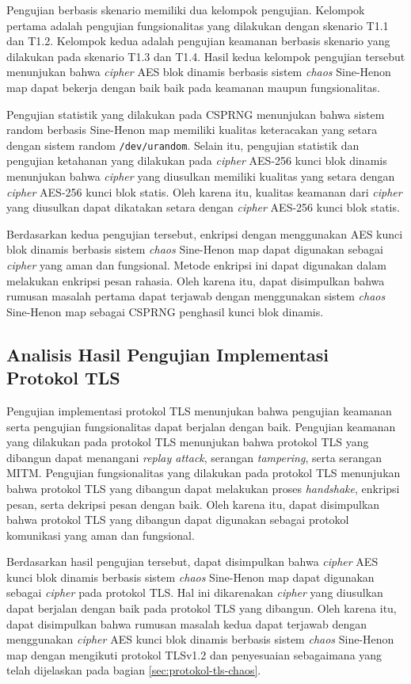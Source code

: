 Pengujian berbasis skenario memiliki dua kelompok pengujian. Kelompok pertama adalah pengujian fungsionalitas yang dilakukan dengan skenario T1.1 dan T1.2. Kelompok kedua adalah pengujian keamanan berbasis skenario yang dilakukan pada skenario T1.3 dan T1.4. Hasil kedua kelompok pengujian tersebut menunjukan bahwa \emph{cipher} AES blok dinamis berbasis sistem \emph{chaos} Sine-Henon map dapat bekerja dengan baik baik pada keamanan maupun fungsionalitas.

Pengujian statistik yang dilakukan pada CSPRNG menunjukan bahwa sistem random berbasis Sine-Henon map memiliki kualitas keteracakan yang setara dengan sistem random \texttt{/dev/urandom}. Selain itu, pengujian statistik dan pengujian ketahanan yang dilakukan pada \emph{cipher} AES-256 kunci blok dinamis menunjukan bahwa \emph{cipher} yang diusulkan memiliki kualitas yang setara dengan \emph{cipher} AES-256 kunci blok statis. Oleh karena itu, kualitas keamanan dari \emph{cipher} yang diusulkan dapat dikatakan setara dengan \emph{cipher} AES-256 kunci blok statis.

Berdasarkan kedua pengujian tersebut, enkripsi dengan menggunakan AES kunci blok dinamis berbasis sistem \emph{chaos} Sine-Henon map dapat digunakan sebagai \emph{cipher} yang aman dan fungsional. Metode enkripsi ini dapat digunakan dalam melakukan enkripsi pesan rahasia. Oleh karena itu, dapat disimpulkan bahwa rumusan masalah pertama dapat terjawab dengan menggunakan sistem \emph{chaos} Sine-Henon map sebagai CSPRNG penghasil kunci blok dinamis.

\subsection{Analisis Hasil Pengujian Implementasi Protokol TLS}

Pengujian implementasi protokol TLS menunjukan bahwa pengujian keamanan serta pengujian fungsionalitas dapat berjalan dengan baik. Pengujian keamanan yang dilakukan pada protokol TLS menunjukan bahwa protokol TLS yang dibangun dapat menangani \emph{replay attack}, serangan \emph{tampering}, serta serangan MITM.  Pengujian fungsionalitas yang dilakukan pada protokol TLS menunjukan bahwa protokol TLS yang dibangun dapat melakukan proses \emph{handshake}, enkripsi pesan, serta dekripsi pesan dengan baik. Oleh karena itu, dapat disimpulkan bahwa protokol TLS yang dibangun dapat digunakan sebagai protokol komunikasi yang aman dan fungsional.

Berdasarkan hasil pengujian tersebut, dapat disimpulkan bahwa \emph{cipher} AES kunci blok dinamis berbasis sistem \emph{chaos} Sine-Henon map dapat digunakan sebagai \emph{cipher} pada protokol TLS. Hal ini dikarenakan \emph{cipher} yang diusulkan dapat berjalan dengan baik pada protokol TLS yang dibangun. Oleh karena itu, dapat disimpulkan bahwa rumusan masalah kedua dapat terjawab dengan menggunakan \emph{cipher} AES kunci blok dinamis berbasis sistem \emph{chaos} Sine-Henon map dengan mengikuti protokol TLSv1.2 dan penyesuaian sebagaimana yang telah dijelaskan pada bagian \ref{sec:protokol-tls-chaos}.

